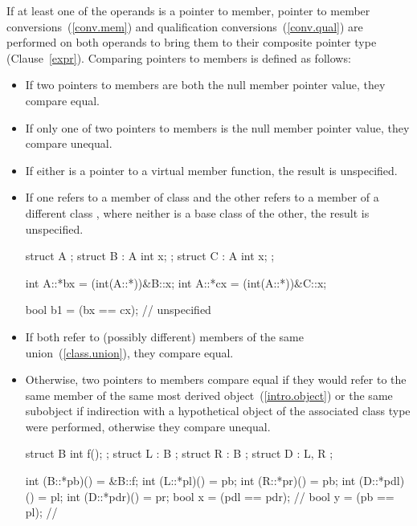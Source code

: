\pnum
If at least one of the operands is a pointer to member, pointer to member
conversions~(\ref{conv.mem}) and qualification
conversions~(\ref{conv.qual}) are performed on both operands to bring them to
their composite pointer type (Clause~\ref{expr}).
Comparing pointers to members is defined as follows:

\begin{itemize}
\item
If two pointers to members are both the null member pointer value, they compare
equal.

\item
If only one of two pointers to members is the null member pointer value, they
compare unequal.

\item
If either is a pointer to a virtual member function, the result is unspecified.

\item
If one refers to a member of class  and the other refers to a member
of a different class , where neither is a base class of the other,
the result is unspecified.
\enterexample
\begin{codeblock}
struct A {};
struct B : A { int x; };
struct C : A { int x; };

int A::*bx = (int(A::*))&B::x;
int A::*cx = (int(A::*))&C::x;

bool b1 = (bx == cx);   // unspecified
\end{codeblock}
\exitexample

\item
If both refer to (possibly different) members of the same union~(\ref{class.union}),
they compare equal.

\item
Otherwise, two pointers to members compare equal if they would refer to the same member of
the same most derived object~(\ref{intro.object}) or the same subobject if
indirection with a hypothetical object of the associated
class type were performed, otherwise they compare unequal.
\enterexample 

\begin{codeblock}
struct B {
  int f();
};
struct L : B { };
struct R : B { };
struct D : L, R { };

int (B::*pb)() = &B::f;
int (L::*pl)() = pb;
int (R::*pr)() = pb;
int (D::*pdl)() = pl;
int (D::*pdr)() = pr;
bool x = (pdl == pdr);          // 
bool y = (pb == pl);            // 
\end{codeblock}
\exitexample
\end{itemize}

